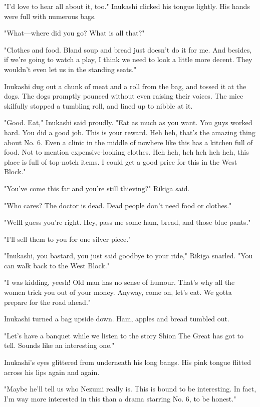 "I'd love to hear all about it, too." Inukashi clicked his tongue
lightly. His hands were full with numerous bags.

"What---where did you go? What is all that?"

"Clothes and food. Bland soup and bread just doesn't do it for me. And
besides, if we're going to watch a play, I think we need to look a
little more decent. They wouldn't even let us in the standing seats."

Inukashi dug out a chunk of meat and a roll from the bag, and tossed it
at the dogs. The dogs promptly pounced without even raising their
voices. The mice skilfully stopped a tumbling roll, and lined up to
nibble at it.

"Good. Eat," Inukashi said proudly. "Eat as much as you want. You guys
worked hard. You did a good job. This is your reward. Heh heh, that's
the amazing thing about No. 6. Even a clinic in the middle of nowhere
like this has a kitchen full of food. Not to mention expensive-looking
clothes. Heh heh, heh heh heh heh, this place is full of top-notch
items. I could get a good price for this in the West Block."

"You've come this far and you're still thieving?" Rikiga said.

"Who cares? The doctor is dead. Dead people don't need food or clothes."

"Well\el I guess you're right. Hey, pass me some ham, bread, and those
blue pants."

"I'll sell them to you for one silver piece."

"Inukashi, you bastard, you just said goodbye to your ride," Rikiga
snarled. "You can walk back to the West Block."

"I was kidding, yeesh! Old man has no sense of humour. That's why all
the women trick you out of your money. Anyway, come on, let's eat. We
gotta prepare for the road ahead."

Inukashi turned a bag upside down. Ham, apples and bread tumbled out.

"Let's have a banquet while we listen to the story Shion The Great has
got to tell. Sounds like an interesting one."

Inukashi's eyes glittered from underneath his long bangs. His pink
tongue flitted across his lips again and again.

"Maybe he'll tell us who Nezumi really is. This is bound to be
interesting. In fact, I'm way more interested in this than a drama
starring No. 6, to be honest."

